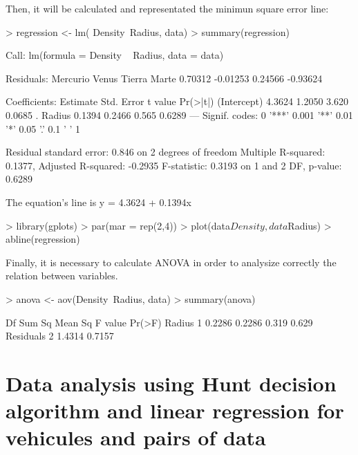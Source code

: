 \documentclass[a4paper]{article}
\begin{document}
Then, it will be calculated and representated the minimun square error line:
\begin{Schunk}
\begin{Sinput}
> regression <- lm( Density~Radius, data)
> summary(regression)
\end{Sinput}
\begin{Soutput}
Call:
lm(formula = Density ~ Radius, data = data)

Residuals:
Mercurio    Venus   Tierra    Marte 
 0.70312 -0.01253  0.24566 -0.93624 

Coefficients:
            Estimate Std. Error t value Pr(>|t|)  
(Intercept)   4.3624     1.2050   3.620   0.0685 .
Radius        0.1394     0.2466   0.565   0.6289  
---
Signif. codes:  0 '***' 0.001 '**' 0.01 '*' 0.05 '.' 0.1 ' ' 1

Residual standard error: 0.846 on 2 degrees of freedom
Multiple R-squared:  0.1377,	Adjusted R-squared:  -0.2935 
F-statistic: 0.3193 on 1 and 2 DF,  p-value: 0.6289
\end{Soutput}
\end{Schunk}

The equation's line is y = 4.3624 + 0.1394x

\begin{Schunk}
\begin{Sinput}
> library(gplots)
> par(mar = rep(2,4))
> plot(data$Density, data$Radius)
> abline(regression)
\end{Sinput}
\end{Schunk}

Finally, it is necessary to calculate ANOVA in order to analysize correctly the relation between variables.

\begin{Schunk}
\begin{Sinput}
> anova <- aov(Density~Radius, data) 
> summary(anova)
\end{Sinput}
\begin{Soutput}
            Df Sum Sq Mean Sq F value Pr(>F)
Radius       1 0.2286  0.2286   0.319  0.629
Residuals    2 1.4314  0.7157               
\end{Soutput}
\end{Schunk}

\section{Data analysis using Hunt decision algorithm and linear regression for vehicules and pairs of data}
\end{document}
